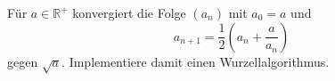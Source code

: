 \begin{aufg}
Für $a \in \mathbb{R}^+$ konvergiert die Folge $(a_n)$ mit $a_0 = a$ und
\[ a_{n+1} = \frac{1}{2}\left(a_n + \frac{a}{a_n}\right) \]
gegen $\sqrt{a}$. Implementiere damit einen Wurzellalgorithmus.
\end{aufg}
